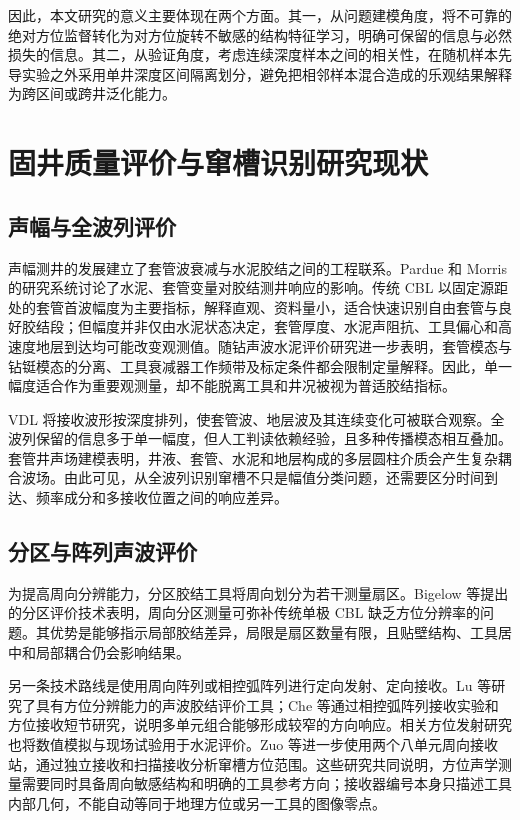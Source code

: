 因此，本文研究的意义主要体现在两个方面。其一，从问题建模角度，将不可靠的绝对方位监督转化为对方位旋转不敏感的结构特征学习，明确可保留的信息与必然损失的信息。其二，从验证角度，考虑连续深度样本之间的相关性，在随机样本先导实验之外采用单井深度区间隔离划分，避免把相邻样本混合造成的乐观结果解释为跨区间或跨井泛化能力。

\section{固井质量评价与窜槽识别研究现状}

\subsection{声幅与全波列评价}

声幅测井的发展建立了套管波衰减与水泥胶结之间的工程联系。Pardue 和 Morris 的研究系统讨论了水泥、套管变量对胶结测井响应的影响\cite{Pardue1963CementBond}。传统 CBL 以固定源距处的套管首波幅度为主要指标，解释直观、资料量小，适合快速识别自由套管与良好胶结段；但幅度并非仅由水泥状态决定，套管厚度、水泥声阻抗、工具偏心和高速度地层到达均可能改变观测值。随钻声波水泥评价研究进一步表明，套管模态与钻铤模态的分离、工具衰减器工作频带及标定条件都会限制定量解释\cite{Kinoshita2013LWDSonicCement}。因此，单一幅度适合作为重要观测量，却不能脱离工具和井况被视为普适胶结指标。

VDL 将接收波形按深度排列，使套管波、地层波及其连续变化可被联合观察。全波列保留的信息多于单一幅度，但人工判读依赖经验，且多种传播模态相互叠加。套管井声场建模表明，井液、套管、水泥和地层构成的多层圆柱介质会产生复杂耦合波场\cite{Wang2017CasedHoleWavefield,Wang2016AcousticCementMethods}。由此可见，从全波列识别窜槽不只是幅值分类问题，还需要区分时间到达、频率成分和多接收位置之间的响应差异。

\subsection{分区与阵列声波评价}

为提高周向分辨能力，分区胶结工具将周向划分为若干测量扇区。Bigelow 等提出的分区评价技术表明，周向分区测量可弥补传统单极 CBL 缺乏方位分辨率的问题\cite{Bigelow1990SegmentedBond}。其优势是能够指示局部胶结差异，局限是扇区数量有限，且贴壁结构、工具居中和局部耦合仍会影响结果。

另一条技术路线是使用周向阵列或相控弧阵列进行定向发射、定向接收。Lu 等研究了具有方位分辨能力的声波胶结评价工具\cite{Lu2014AzimuthalAcoustic}；Che 等通过相控弧阵列接收实验和方位接收短节研究，说明多单元组合能够形成较窄的方向响应\cite{Che2014PhasedArcReception,Che2017AzimuthalReceiver}。相关方位发射研究也将数值模拟与现场试验用于水泥评价\cite{Che2016AzimuthalCement}。Zuo 等进一步使用两个八单元周向接收站，通过独立接收和扫描接收分析窜槽方位范围\cite{Zuo2020AzimuthCement}。这些研究共同说明，方位声学测量需要同时具备周向敏感结构和明确的工具参考方向；接收器编号本身只描述工具内部几何，不能自动等同于地理方位或另一工具的图像零点。

